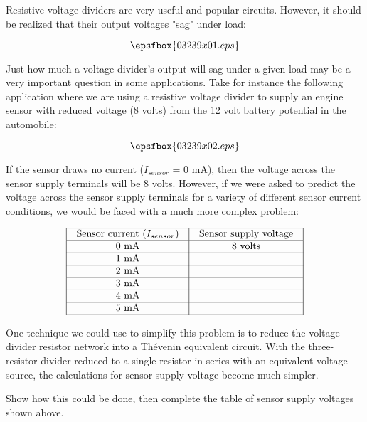

Resistive voltage dividers are very useful and popular circuits.  However, it should be realized that their output voltages "sag" under load:

$$\epsfbox{03239x01.eps}$$

Just how much a voltage divider's output will sag under a given load may be a very important question in some applications.  Take for instance the following application where we are using a resistive voltage divider to supply an engine sensor with reduced voltage (8 volts) from the 12 volt battery potential in the automobile:

$$\epsfbox{03239x02.eps}$$

If the sensor draws no current ($I_{sensor}$ = 0 mA), then the voltage across the sensor supply terminals will be 8 volts.  However, if we were asked to predict the voltage across the sensor supply terminals for a variety of different sensor current conditions, we would be faced with a much more complex problem:


$$\vbox{\offinterlineskip
\halign{\strut
\vrule \quad\hfil # \ \hfil & 
\vrule \quad\hfil # \ \hfil \vrule \cr
\noalign{\hrule}
%
Sensor current ($I_{sensor}$) & Sensor supply voltage \cr
%
\noalign{\hrule}
%
0 mA & 8 volts \cr
%
\noalign{\hrule}
%
1 mA &  \cr
%
\noalign{\hrule}
%
2 mA &  \cr
%
\noalign{\hrule}
%
3 mA &  \cr
%
\noalign{\hrule}
%
4 mA &  \cr
%
\noalign{\hrule}
%
5 mA &  \cr
%
\noalign{\hrule}
} %
}$$ %

One technique we could use to simplify this problem is to reduce the voltage divider resistor network into a Th\'evenin equivalent circuit.  With the three-resistor divider reduced to a single resistor in series with an equivalent voltage source, the calculations for sensor supply voltage become much simpler.

Show how this could be done, then complete the table of sensor supply voltages shown above.






